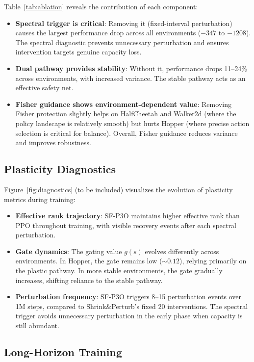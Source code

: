 \documentclass{article}
\begin{document}
Table~\ref{tab:ablation} reveals the contribution of each component:

\begin{itemize}
    \item \textbf{Spectral trigger is critical}: Removing it (fixed-interval perturbation) causes the largest performance drop across all environments ($-347$ to $-1208$). The spectral diagnostic prevents unnecessary perturbation and ensures intervention targets genuine capacity loss.
    \item \textbf{Dual pathway provides stability}: Without it, performance drops 11--24\% across environments, with increased variance. The stable pathway acts as an effective safety net.
    \item \textbf{Fisher guidance shows environment-dependent value}: Removing Fisher protection slightly helps on HalfCheetah and Walker2d (where the policy landscape is relatively smooth) but hurts Hopper (where precise action selection is critical for balance). Overall, Fisher guidance reduces variance and improves robustness.
\end{itemize}


\subsection{Plasticity Diagnostics}
\label{sec:diagnostics}

Figure~\ref{fig:diagnostics} (to be included) visualizes the evolution of plasticity metrics during training:
\begin{itemize}
    \item \textbf{Effective rank trajectory}: SF-P3O maintains higher effective rank than PPO throughout training, with visible recovery events after each spectral perturbation.
    \item \textbf{Gate dynamics}: The gating value $g(s)$ evolves differently across environments. In Hopper, the gate remains low ($\sim 0.12$), relying primarily on the plastic pathway. In more stable environments, the gate gradually increases, shifting reliance to the stable pathway.
    \item \textbf{Perturbation frequency}: SF-P3O triggers 8--15 perturbation events over 1M steps, compared to Shrink\&Perturb's fixed 20 interventions. The spectral trigger avoids unnecessary perturbation in the early phase when capacity is still abundant.
\end{itemize}


\subsection{Long-Horizon Training}
\end{document}
